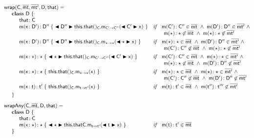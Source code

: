 \documentclass[acmlarge, anonymous, authordraft]{acmart}
\begin{document}
\newcommand{\bscast}[2]{\EM{\BehCast{#1}{{#2}}}}

\begin{figure}[!ht]
\hrulefill


\[
\begin{array}{@{}ll@{}l@{}r@{~}c@{~}r}
    \wrap\C\bmt\bmtp\D\that = \\
\SP \class ~\D ~ \{\\
\SPP \Fdef\that\C \\
\SPP \Mdef\m\x\Dp\Dpp {~\bscast\Dpp{{\KCall{\this.\that()_{\C}} \m {\bscast{\Cp}\x}\Cp\Cpp }}~}
&     \textit{if}\,\,\,\,\,\, \Mtype\m\Cp\Cpp\in\bmt ~\wedge~ \Mtype\m\Dp\Dpp\in\bmtp ~\wedge~ \\
&     \multicolumn{5}{l}{\qquad \Mtype\m\any\any\not\in\bmt ~\wedge~ \Mtype\m\any\any\not\in\bmtp} \\
\\[-3mm]
\SPP \Mdef\m\x\Dp\Dpp{~\bscast\Dpp{\KCall{\this.\that()_{\C}} \m {\bscast\any\x}\any\any }~}
&    \textit{if}\,\,\,\,\,\, \Mtype\m\any\any\in\bmt ~\wedge~ \Mtype\m\Dp\Dpp\in\bmtp ~\wedge~  \\
&     \multicolumn{5}{l}{\qquad \Mtype\m\Cp\Cpp\not\in\bmt ~\wedge~  \Mtype\m\any\any\not\in\bmtp } \\
\\[-3mm]
\SPP \Mdef\m\x\any\any{~\bscast\any{\KCall{\this.\that()_{\C}}\m{\bscast{\Cp}\x}\Cp\Cpp}~}
&    \textit{if}\,\,\,\,\,\, \Mtype\m\Cp\Cpp\in\bmt ~\wedge~ \Mtype\m\any\any\in\bmtp ~\wedge~   \\
&     \multicolumn{5}{l}{\qquad \Mtype\m\any\any\not\in\bmt ~\wedge~  \Mtype\m\Dp\Dpp\not\in\bmtp } \\
\\[-3mm]
\SPP \Mdef\m\x\any\any{~{\KCall{\this.\that()_{\C}}\m{\x}\any\any}~}
&    \textit{if}\,\,\,\,\,\, \Mtype\m\any\any\in\bmt ~\wedge~ \Mtype\m\any\any\in\bmtp ~\wedge~ \\
&     \multicolumn{5}{l}{\qquad \Mtype\m\Cp\Cpp\not\in\bmt ~\wedge~ \Mtype\m\Dp\Dpp\not\in\bmtp} \\
\\[-3mm]
\SPP \Mdef\m\x{\t}{\tp}{~\KCall{\this.\that()_{\C}}\m{\x}\t\tp~}
&    \textit{if}\,\,\,\,\,\, \Mtype\m\t\tp\in\bmt ~\wedge~ \Mtype\m\tpp\tppp\not\in \bmtp \\
\\[-3mm]
\SP \}
\\[3mm]
\wrapAny\C\bmt\D\that = \\
\SP \class~\D~\{\\
\SPP \Fdef \that \C\\ 
\SPP   \Mdef\m\x\any\any {~\bscast\any{\KCall{\FRead\that\C}\m{\bscast{\t}\x}\t\tp }~}
& \textit{if}\,\,\,\,\,\,  \Mtype\m\t\tp\in\b\mt \\
\SP \}\\


\end{array}\]
\end{figure}
\end{document}
